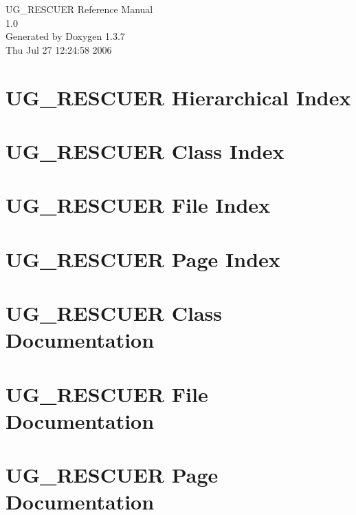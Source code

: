 \documentclass[a4paper]{book}
\begin{document}
\begin{titlepage}
\vspace*{7cm}
\begin{center}
{\Large UG\_\-RESCUER Reference Manual\\[1ex]\large 1.0 }\\
\vspace*{1cm}
{\large Generated by Doxygen 1.3.7}\\
\vspace*{0.5cm}
{\small Thu Jul 27 12:24:58 2006}\\
\end{center}
\end{titlepage}
\clearemptydoublepage
{}
\tableofcontents
\clearemptydoublepage
{}
\chapter{UG\_\-RESCUER Hierarchical Index}

\chapter{UG\_\-RESCUER Class Index}

\chapter{UG\_\-RESCUER File Index}

\chapter{UG\_\-RESCUER Page Index}

\chapter{UG\_\-RESCUER Class Documentation}






\chapter{UG\_\-RESCUER File Documentation}













\chapter{UG\_\-RESCUER Page Documentation}

\printindex
\end{document}
